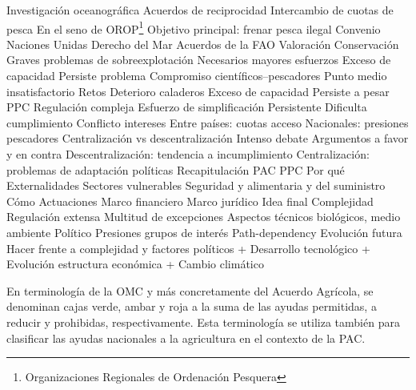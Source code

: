 \documentclass{nuevotema}
\begin{document}
\begin{esquemal}
				\4[] Investigación oceanográfica
				\4 {Acuerdos de reciprocidad}
				\4[] Intercambio de cuotas de pesca
				\4[] En el seno de OROP\footnote{Organizaciones Regionales de Ordenación Pesquera}
				\4[] Objetivo principal: frenar pesca ilegal
				\4[] Convenio Naciones Unidas Derecho del Mar
				\4[] Acuerdos de la FAO
		\2 Valoración
			\3 Conservación
				\4 Graves problemas de sobreexplotación
				\4 Necesarios mayores esfuerzos
			\3 Exceso de capacidad
				\4 Persiste problema
			\3 Compromiso científicos--pescadores
				\4 Punto medio insatisfactorio
		\2 Retos
			\3 Deterioro caladeros
			\3 Exceso de capacidad
				\4 Persiste a pesar PPC
			\3 Regulación compleja
				\4 Esfuerzo de simplificación
				\4 Persistente
				\4 Dificulta cumplimiento
			\3 Conflicto intereses
				\4 Entre países: cuotas acceso
				\4 Nacionales: presiones pescadores
			\3 Centralización vs descentralización
				\4 Intenso debate
				\4 Argumentos a favor y en contra
				\4 Descentralización: tendencia a incumplimiento
				\4 Centralización: problemas de adaptación políticas
	\1[] 
		\2 Recapitulación
			\3 PAC
			\3 PPC
			\3 Por qué
				\4 Externalidades
				\4 Sectores vulnerables
				\4 Seguridad y alimentaria y del suministro
			\3 Cómo
				\4 Actuaciones
				\4 Marco financiero
				\4 Marco jurídico
		\2 Idea final
			\3 Complejidad
				\4 Regulación extensa
				\4 Multitud de excepciones
				\4 Aspectos técnicos biológicos, medio ambiente
			\3 Político
				\4 Presiones grupos de interés
				\4 Path-dependency
			\3 Evolución futura
				\4 Hacer frente a complejidad y factores políticos
				\4 + Desarrollo tecnológico
				\4 + Evolución estructura económica
				\4 + Cambio climático
\end{esquemal}


























\conceptos


En terminología de la OMC y más concretamente del Acuerdo Agrícola, se denominan cajas verde, ambar y roja a la suma de las ayudas permitidas, a reducir y prohibidas, respectivamente. Esta terminología se utiliza también para clasificar las ayudas nacionales a la agricultura en el contexto de la PAC.
\end{document}
